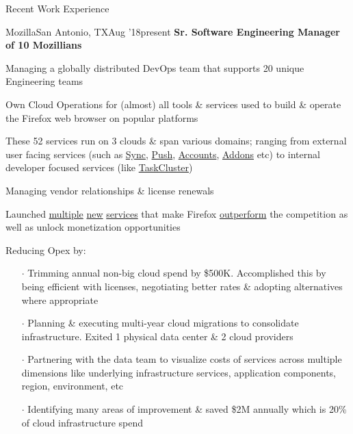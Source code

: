 \documentclass{resume} %
\begin{document}
\begin{rSection}{Recent Work Experience}


\begin{rSubsection}{Mozilla}{San Antonio, TX}{Aug '18}{present}
  {\textbf{Sr. Software Engineering Manager of 10 Mozillians}}

\item Managing a globally distributed DevOps team that supports 20 unique Engineering teams
\item Own Cloud Operations for (almost) all tools \& services used to build \& operate the Firefox web browser on popular platforms
\item These 52 services run on 3 clouds \& span various domains; ranging from external user facing services (such as \href{https://github.com/mozilla-services/syncstorage-rs}{Sync}, \href{https://github.com/mozilla-services/autopush-rs}{Push}, \href{https://github.com/mozilla/fxa}{Accounts}, \href{https://github.com/mozilla/addons}{Addons} etc) to internal developer focused services (like \href{https://github.com/taskcluster}{TaskCluster})
  \item Managing vendor relationships \& license renewals
\item Launched \href{https://vpn.mozilla.org/}{multiple} \href{https://fpn.firefox.com/}{new} \href{https://monitor.firefox.com/}{services} that make Firefox \href{https://blog.mozilla.org/security/2020/01/21/crlite-part-3-speeding-up-secure-browsing/}{outperform} the competition as well as unlock monetization opportunities
  \item Reducing Opex by:
  \vspace{-0.5em}
    \begin{itemize} \itemsep0.5pt \parskip0pt
    \item[$\cdot$] Trimming annual non-big cloud spend by \$500K. Accomplished this by being efficient with licenses, negotiating better rates \& adopting alternatives where appropriate
    \item[$\cdot$] Planning \& executing multi-year cloud migrations to consolidate infrastructure. Exited 1 physical data center \& 2 cloud providers
    \item[$\cdot$] Partnering with the data team to visualize costs of services across multiple dimensions like underlying infrastructure services, application components, region, environment, etc
    \item[$\cdot$] Identifying many areas of improvement \& saved \$2M annually which is 20\% of cloud infrastructure spend

\end{itemize}
\end{rSubsection}
\end{rSection}
\end{document}
